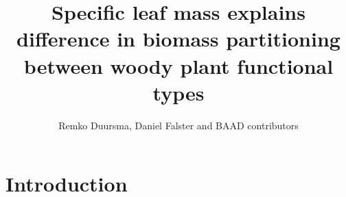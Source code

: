 \documentclass[a4paper]{article}\usepackage[]{graphicx}\usepackage[]{color}
\begin{document}
\title{Specific leaf mass explains difference in biomass partitioning between woody plant functional types}

\author{Remko Duursma, Daniel Falster and BAAD contributors}

\maketitle








\section{Introduction}
\end{document}
